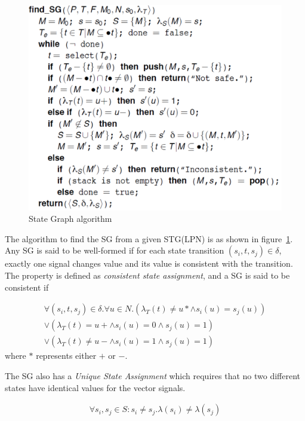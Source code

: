 \documentclass[10pt,journal,compsoc]{IEEEtran}
\begin{document}
\begin{figure}[hbt]
  \begin{center}
  \includegraphics[scale = 0.37]{sg_algo}
  \end{center}
  \vspace{-2ex}
  \caption{State Graph algorithm}
  \label{sg_algo}
  \vspace{-1ex}
\end{figure}

The algorithm to find the SG from a given STG(LPN) is as shown in figure~\ref{sg_algo}.
Any SG is said to be well-formed if for each state transition $(s_i,t,s_j) \in \delta$, exactly
one signal changes value and its value is consistent with the transition. The property is defined as \textit{consistent state assignment}, and a SG is said to be consistent if

\begin{align*}
\forall (s_i,t,s_j) \in \delta.\forall u \in N .(\lambda_T(t) \neq u* \wedge s_i(u) = s_j(u))\\ \vee
(\lambda_T(t) = u+ \wedge s_i(u) = 0 \wedge s_j(u) = 1) \\ \vee (\lambda_T(t) \neq u- \wedge s_i(u)= 1 \wedge s_j(u)= 1)
\end{align*} 
where $*$ represents either $+$ or $-$.

The SG also has a \textit{Unique State Assignment} which requires that no two different states have identical values for the vector signals.

\begin{align*}
\forall s_i,s_j \in S: s_i\neq s_j.\lambda(s_i) \neq \lambda(s_j)
\end{align*} 
\end{document}
